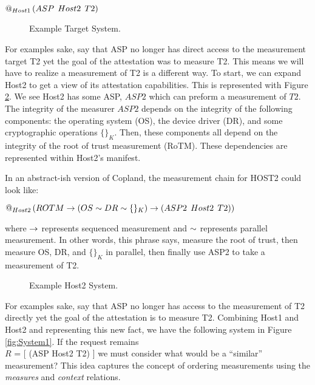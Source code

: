 \documentclass[12pt, letterpaper]{article}
\begin{document}
\begin{center}
  $ \mathop{@_{Host1}}{(}ASP\:\: Host2\:\: T2)$
\end{center}

\begin{figure}[]
  \centering 
  \caption{Example Target System.}
  \label{fig:Host1}
\end{figure}

For examples sake, say that ASP no longer has direct access to the measurement target T2 yet the goal of the attestation was to measure T2. This means we will have to realize a measurement of T2 is a different way. To start, we can expand Host2 to get a view of its attestation capabilities. This is represented with Figure \ref{fig:Host2}. We see Host2 has some ASP, $ASP2$ which can preform a measurement of $T2$. The integrity of the measurer $ASP2$ depends on the integrity of the following components: the operating system (OS), the device driver (DR), and some cryptographic operations $ \{ \}_{K}$. Then, these components all depend on the integrity of the root of trust measurement (RoTM). These dependencies are represented within Host2's manifest. 

In an abstract-ish version of Copland, the measurement chain for HOST2 could look like: 

\begin{center}
  $ \mathop{@_{Host2}}{(ROTM \to ( OS \stackrel{}{\sim} DR \stackrel{}{\sim} \{ \}_{K} ) \to (ASP2\:\: Host2\:\: T2))}$
\end{center}

where $\to$ represents sequenced measurement and $\stackrel{}{\sim}$ represents parallel measurement. In other words, this phrase says, measure the root of trust, then measure OS, DR, and $\{ \}_{K}$ in parallel, then finally use ASP2 to take a measurement of T2. 


\begin{figure}[]
  \centering 
  \caption{Example Host2 System.}
  \label{fig:Host2}
\end{figure}

For examples sake, say that ASP no longer has access to the measurement of T2 directly yet the goal of the attestation is to measure T2. Combining Host1 and Host2 and representing this new fact, we have the following system in Figure \ref{fig:System1}. If the request remains \\  $R$ = [ (ASP Host2 T2) ] we must consider what would be a ``similar'' measurement? This idea captures the concept of ordering measurements using the \emph{measures} and \emph{context} relations. 
\end{document}
